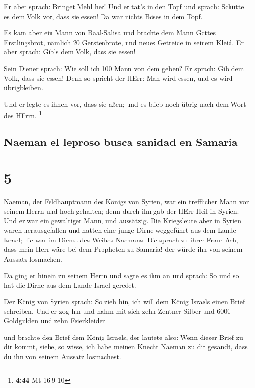  Er aber sprach: Bringet Mehl her! Und er tat's in den
Topf und sprach: Schütte es dem Volk vor, dass sie essen! Da war nichts
Böses in dem Topf.

 Es kam aber ein Mann von Baal-Salisa und brachte dem
Mann Gottes Erstlingsbrot, nämlich 20 Gerstenbrote, und neues Getreide
in seinem Kleid. Er aber sprach: Gib's dem Volk, dass sie essen!

 Sein Diener sprach: Wie soll ich 100 Mann von dem geben?
Er sprach: Gib dem Volk, dass sie essen! Denn so spricht der HErr: Man
wird essen, und es wird übrigbleiben.

 Und er legte es ihnen vor, dass sie aßen; und es blieb
noch übrig nach dem Wort des HErrn. \footnote{\textbf{4:44} Mt 16,9-10}

\hypertarget{naeman-el-leproso-busca-sanidad-en-samaria}{%
\subsection{Naeman el leproso busca sanidad en
Samaria}\label{naeman-el-leproso-busca-sanidad-en-samaria}}

\hypertarget{section-4}{%
\section{5}\label{section-4}}

 Naeman, der Feldhauptmann des Königs von Syrien, war ein
trefflicher Mann vor seinem Herrn und hoch gehalten; denn durch ihn gab
der HErr Heil in Syrien. Und er war ein gewaltiger Mann, und aussätzig.
 Die Kriegsleute aber in Syrien waren herausgefallen und
hatten eine junge Dirne weggeführt aus dem Lande Israel; die war im
Dienst des Weibes Naemans.  Die sprach zu ihrer Frau: Ach,
dass mein Herr wäre bei dem Propheten zu Samaria! der würde ihn von
seinem Aussatz losmachen.

 Da ging er hinein zu seinem Herrn und sagte es ihm an und
sprach: So und so hat die Dirne aus dem Lande Israel geredet.

 Der König von Syrien sprach: So zieh hin, ich will dem
König Israels einen Brief schreiben. Und er zog hin und nahm mit sich
zehn Zentner Silber und 6000 Goldgulden und zehn Feierkleider

 und brachte den Brief dem König Israels, der lautete
also: Wenn dieser Brief zu dir kommt, siehe, so wisse, ich habe meinen
Knecht Naeman zu dir gesandt, dass du ihn von seinem Aussatz losmachest.

